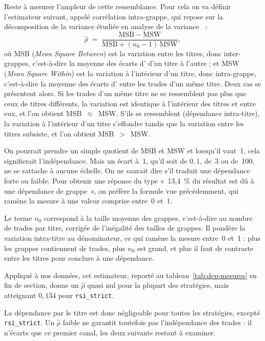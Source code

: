 Reste à mesurer l'ampleur de cette ressemblance. Pour cela on va définir
l'estimateur suivant, appelé corrélation intra-grappe, qui repose sur la
décomposition de la variance étudiée en analyse de la
variance~\cite{scheffe1959} :
\[
  \hat\rho \;=\; \frac{\mathrm{MSB}-\mathrm{MSW}}
                      {\mathrm{MSB} + (n_0 - 1)\,\mathrm{MSW}},
\]
où MSB (\emph{Mean Square Between}) est la variation entre les
titres, donc inter-grappes, c'est-à-dire la moyenne des écarts d'\edgevar{}
d'un titre à l'autre ; et MSW (\emph{Mean Square Within}) est la variation
à l'intérieur d'un titre, donc intra-grappe, c'est-à-dire la moyenne
des écarts d'\edgevar{} entre les trades d'un même titre.
Deux cas se présentent alors. Si les trades d'un même titre ne se ressemblent
pas plus que ceux de titres différents, la variation est identique à
l'intérieur des titres et entre eux, et l'on obtient MSB~$\approx$~MSW. S'ils
se ressemblent (dépendance intra-titre), la variation à l'intérieur d'un titre
s'effondre tandis que la variation entre les titres subsiste, et l'on obtient
MSB~$>$~MSW.

On pourrait prendre un simple quotient de MSB et MSW et lorsqu'il vaut~1,
cela signifierait l'indépendance. Mais un écart à~1, qu'il soit de
$0{,}1$, de~3 ou de~100, ne se rattache à aucune échelle. On ne saurait
dire s'il traduit une dépendance forte ou faible.
Pour obtenir une réponse du type «~13{,}4~\% du résultat est dû à une
dépendance de grappe~», on préfère la formule vue précédemment, qui ramène
la mesure à une valeur comprise entre~0 et~1.

Le terme $n_0$ correspond à la taille moyenne des grappes, c'est-à-dire au
nombre de trades par titre, corrigée de l'inégalité des tailles de grappes.
Il pondère la variation intra-titre au dénominateur, ce qui ramène la mesure
entre~0 et~1 : plus les grappes contiennent de trades, plus $n_0$ est grand,
et plus il faut de contraste entre les titres pour conclure à une dépendance.

Appliqué à nos données, cet estimateur, reporté au
tableau~\ref{tab:dep-mesures} en fin de section, donne un $\hat\rho$ quasi nul
pour la plupart des stratégies, mais atteignant $0{,}134$ pour
\texttt{rsi\_strict}.

La dépendance par le titre est donc négligeable pour toutes les stratégies,
excepté \texttt{rsi\_strict}. Un $\hat\rho$ faible ne garantit toutefois pas
l'indépendance des trades : il n'écarte que ce premier canal, les deux suivants
restant à examiner.



